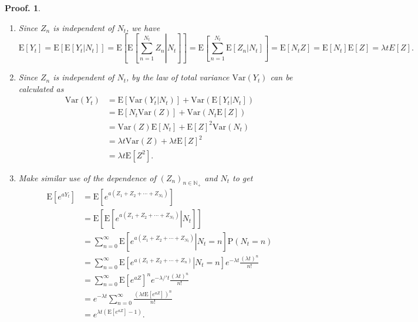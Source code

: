 \documentclass{article}
\theoremstyle{nonumberplain}
\newtheorem{Proof}{Proof.}
\begin{document}
\begin{Proof}\hspace*{1em}	
\begin{enumerate}
	\item Since $Z_n$ is independent of $N_t$, we have $$\mathrm{E}[Y_t]=\mathrm{E}[\mathrm{E}[Y_t|N_t]]=\mathrm{E}\left[\mathrm{E}\left[\left.\sum _{n=1}^{N_t}Z_{n}\right|N_t\right]\right]=\mathrm{E}\left[\sum _{n=1}^{N_t}\mathrm{E}\left[\left.Z_{n}\right|N_t\right]\right]=\mathrm{E}[N_tZ]=\mathrm{E}[N_t]\mathrm{E}[Z]=\lambda tE[Z].$$
	\item Since $Z_n$ is independent of $N_t$, by the law of total variance $\mathrm{Var}(Y_t)$ can be calculated as
	\begin{align*}
		\mathrm{Var}(Y_t)&=\mathrm{E}[\mathrm{Var}(Y_t|N_t)]+\mathrm{Var}(\mathrm{E}[Y_t|N_t])\\
		&=\mathrm{E}[N_t\mathrm{Var}(Z)]+\mathrm{Var}(N_t\mathrm{E}[Z])\\
		&=\mathrm{Var}(Z)\mathrm{E}[N_t]+\mathrm{E}[Z]^2\mathrm{Var}(N_t)\\
		&=\lambda t\mathrm{Var}(Z)+\lambda t\mathrm{E}[Z]^2\\
		&=\lambda t \mathrm{E}[Z^2].
	\end{align*}
	\item Make similar use of the dependence of $(Z_n)_{n\in\mathbb{N_+}}$ and $N_t$ to get
	\begin{align*}
	\mathrm{E}\left[e^{aY_t}\right]&=\mathrm{E}\left[e^{a\left(Z_1+Z_2+\cdots+Z_{N_t}\right)}\right]\\
	&=\mathrm{E}\left[\mathrm{E}\left[\left.e^{a\left(Z_1+Z_2+\cdots+Z_{N_t}\right)}\right|N_t\right]\right]\\
	&=\sum_{n=0}^{\infty}\mathrm{E}\left[\left.e^{a\left(Z_1+Z_2+\cdots+Z_{N_t}\right)}\right|N_t=n\right]\mathrm{P}\left(N_t=n\right)\\
	&=\sum_{n=0}^{\infty}\mathrm{E}\left[\left.e^{a\left(Z_1+Z_2+\cdots+Z_{n}\right)}\right|N_t=n\right]e^{-\lambda t}\frac{\left(\lambda t\right)^n}{n!}\\
	&=\sum_{n=0}^{\infty}\mathrm{E}\left[e^{aZ}\right]^ne^{-\lambda/' t}\frac{\left(\lambda t\right)^n}{n!}\\
	&=e^{-\lambda t}\sum_{n=0}^{\infty}\frac{\left(\lambda t\mathrm{E}\left[e^{aZ}\right]\right)^n}{n!}\\
	&=e^{\lambda t\left(\mathrm{E}\left[e^{aZ}\right]-1\right)}.
	\end{align*}
\end{enumerate}

\end{Proof}
\end{document}
